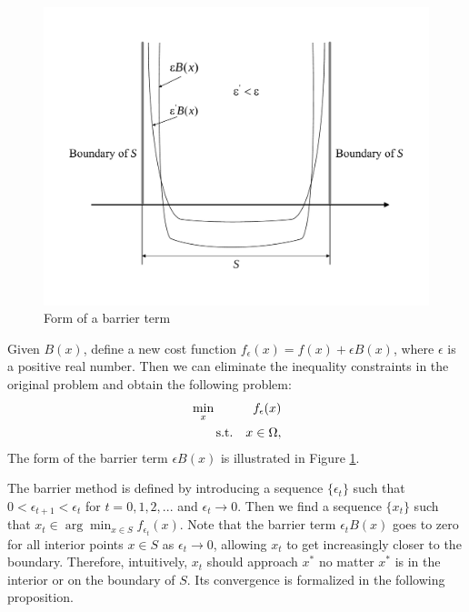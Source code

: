 \begin{figure}[ht]
\centering
\includegraphics[scale=0.4]{figures/lecture25-barrier_function}
\caption{Form of a barrier term}
\label{fig:barrier}
\end{figure}

Given $B(x)$, define a new cost function $f_\epsilon(x)=f(x)+\epsilon{B(x)}$, where $\epsilon$ is a positive real number. Then we can eliminate the inequality constraints in the original problem and obtain the following problem: 
\begin{equation}
\begin{aligned}
&\min_x & {f_\epsilon(x)}\\
&\qquad\text{s.t.} & x\in{\Omega},\\
\end{aligned}
\end{equation}
The form of the barrier term $\epsilon{B(x)}$ is illustrated in Figure \ref{fig:barrier}.

The barrier method is defined by introducing a sequence $\{\epsilon_t\}$ such that $0<\epsilon_{t+1}<\epsilon_t$ for $t=0,1,2,...$ and $\epsilon_t\rightarrow{0}$. Then we find a sequence $\{x_t\}$ such that $x_t\in{\arg \min_{x\in{S}}}f_{\epsilon_t}(x)$. Note that the barrier term $\epsilon_t{B(x)}$ goes to zero for all interior points $x\in{S}$ as $\epsilon_t\rightarrow{0}$, allowing $x_t$ to get increasingly closer to the boundary. Therefore, intuitively, $x_t$ should approach $x^*$ no matter $x^*$ is in the interior or on the boundary of $S$. Its convergence is formalized in the following proposition. 

